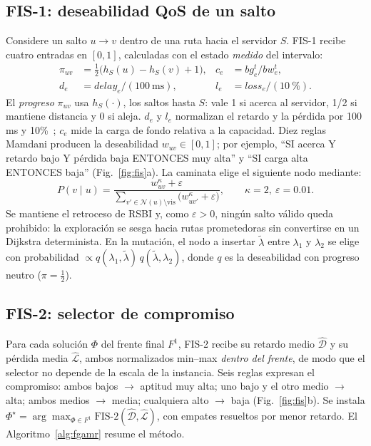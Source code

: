 \documentclass[conference]{IEEEtran}
\newcommand{\Dc}{\mathcal{D}}
\newcommand{\Lc}{\mathcal{L}}
\begin{document}
\subsection{FIS-1: deseabilidad QoS de un salto}
Considere un salto $u\to v$ dentro de una ruta hacia el servidor $S$. FIS-1 recibe cuatro entradas en $[0,1]$, calculadas con el estado \emph{medido} del intervalo:
\begin{equation}
\begin{aligned}
\pi_{uv}&=\tfrac12\big(h_S(u)-h_S(v)+1\big), & c_e&=bg_e^t/bw_e^t,\\
d_e&=delay_e/(100\ \mathrm{ms}), & l_e&=loss_e/(10\ \%).
\end{aligned}
\end{equation}
El \emph{progreso} $\pi_{uv}$ usa $h_S(\cdot)$, los saltos hasta $S$: vale 1 si acerca al servidor, 1/2 si mantiene distancia y 0 si aleja. $d_e$ y $l_e$ normalizan el retardo y la pérdida por 100\,ms y 10\%~\cite{tran2025gamr}; $c_e$ mide la carga de fondo relativa a la capacidad. Diez reglas Mamdani producen la deseabilidad $w_{uv}\in[0,1]$; por ejemplo, ``SI acerca Y retardo bajo Y pérdida baja ENTONCES muy alta'' y ``SI carga alta ENTONCES baja'' (Fig.~\ref{fig:fis}a). La caminata elige el siguiente nodo mediante:
\begin{equation}
P(v\mid u)=\frac{w_{uv}^{\kappa}+\varepsilon}{\sum_{v'\in\mathcal{N}(u)\setminus\mathrm{vis}}\big(w_{uv'}^{\kappa}+\varepsilon\big)},\qquad \kappa=2,\ \varepsilon=0.01 .\label{eq:ruleta}
\end{equation}
Se mantiene el retroceso de RSBI y, como $\varepsilon>0$, ningún salto válido queda prohibido: la exploración se sesga hacia rutas prometedoras sin convertirse en un Dijkstra determinista. En la mutación, el nodo a insertar $\tilde\lambda$ entre $\lambda_1$ y $\lambda_2$ se elige con probabilidad $\propto q(\lambda_1,\tilde\lambda)\,q(\tilde\lambda,\lambda_2)$, donde $q$ es la deseabilidad con progreso neutro ($\pi=\tfrac12$).

\subsection{FIS-2: selector de compromiso}
Para cada solución $\Phi$ del frente final $F^1$, FIS-2 recibe su retardo medio $\hat{\Dc}$ y su pérdida media $\hat{\Lc}$, ambos normalizados min--max \emph{dentro del frente}, de modo que el selector no depende de la escala de la instancia. Seis reglas expresan el compromiso: ambos bajos $\to$ aptitud muy alta; uno bajo y el otro medio $\to$ alta; ambos medios $\to$ media; cualquiera alto $\to$ baja (Fig.~\ref{fig:fis}b). Se instala $\Phi^\star=\arg\max_{\Phi\in F^1}\text{FIS-2}(\hat{\Dc},\hat{\Lc})$, con empates resueltos por menor retardo. El Algoritmo~\ref{alg:fgamr} resume el método.
\end{document}
